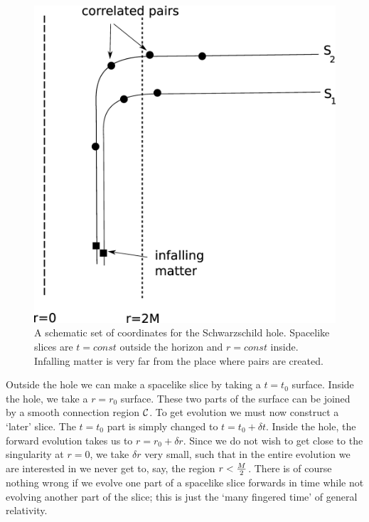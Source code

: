 \documentclass[12pt]{article}
\begin{document}
 \begin{figure}[htbp]
\begin{center}
\includegraphics[scale=.18]{ftwo.eps}
\caption{{A schematic set of coordinates for the Schwarzschild hole. Spacelike slices are $t=const$ outside the horizon and $r=const$ inside. Infalling matter is very far from the place where pairs are created.}}
\label{ftwo}
\end{center}
\end{figure}


Outside the hole we can make a spacelike slice by taking a $t=t_0$ surface. Inside the hole, we take a $r=r_0$ surface. These two parts of the surface can be joined by a smooth connection region ${\cal C}$.
To get evolution we must now construct a `later' slice. The $t=t_0$ part is simply changed to $t=t_0+\delta t$. Inside the hole, the forward evolution takes us to $r=r_0+\delta r$. Since we do not wish to get close to the singularity at $r=0$, we take $\delta r$ very small, such that in the entire evolution we are interested in we never get to, say, the region $r<{M\over 2}$. There is of course nothing wrong if we evolve one part of a spacelike slice forwards in time while not evolving another part of the slice; this is just the `many fingered time' of general relativity.
\end{document}
